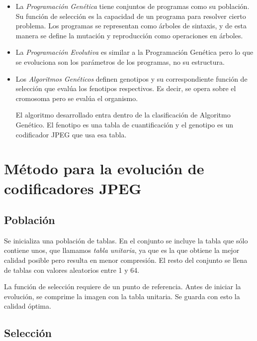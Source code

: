 \begin{itemize}
\item La \emph{Programación Genética} \cite{GenProg} tiene conjuntos de
programas como su población. Su función de selección es la capacidad de un
programa para resolver cierto problema. Los programas se representan como
árboles de sintaxis, y de esta manera se define la mutación y reproducción como
operaciones en árboles.
\item La \emph{Programación Evolutiva} es similar a la Programación Genética
pero lo que se evoluciona son los parámetros de los programas, no su
estructura.
\item Los \emph{Algoritmos Genéticos} definen genotipos y su correspondiente
función de selección que evalúa los fenotipos respectivos. Es decir, se opera
sobre el cromosoma pero se evalúa el organismo.

El algoritmo desarrollado entra dentro de la clasificación de Algoritmo
Genético. El fenotipo es una tabla de cuantificación y el genotipo es un
codificador JPEG que usa esa tabla.

\end{itemize}

\section{Método para la evolución de codificadores JPEG}

\subsection{Población}

Se inicializa una población de tablas. En el conjunto se incluye la tabla que
sólo contiene unos, que llamamos \emph{tabla unitaria}, ya que es la que
obtiene la mejor calidad posible pero resulta en menor compresión. El resto del
conjunto se llena de tablas con valores aleatorios entre 1 y 64.

La función de selección requiere de un punto de referencia. Antes de iniciar la
evolución, se comprime la imagen con la tabla unitaria. Se guarda con esto la
calidad óptima.

\subsection{Selección}


